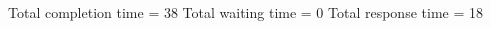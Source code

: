 \begin{RTGrid}[width=0.8\textwidth]{5}{20}
\end{RTGrid}\newline\newline
Total completion time = 38\newline
Total waiting time = 0\newline
Total response time = 18\newline
